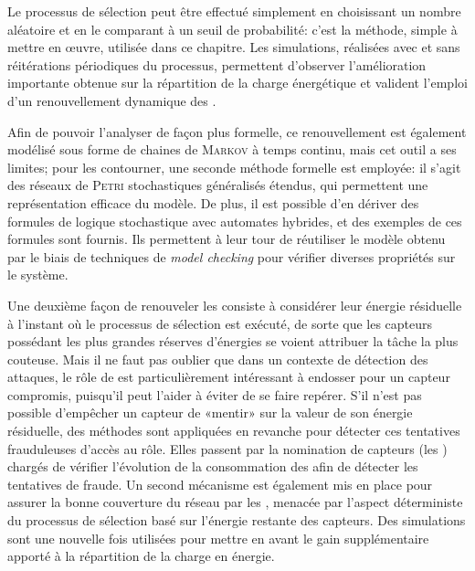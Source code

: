 Le processus de sélection peut être effectué simplement en choisissant un nombre aléatoire et en le comparant à un seuil de probabilité: c'est la méthode, simple à mettre en œuvre, utilisée dans ce chapitre.
Les simulations, réalisées avec et sans réitérations périodiques du processus, permettent d'observer l'amélioration importante obtenue sur la répartition de la charge énergétique et valident l'emploi d'un renouvellement dynamique des \cnst.

Afin de pouvoir l'analyser de façon plus formelle, ce renouvellement est également modélisé sous forme de chaines de \textsc{Markov} à temps continu, mais cet outil a ses limites; pour les contourner, une seconde méthode formelle est employée: il s'agit des réseaux de \textsc{Petri} stochastiques généralisés étendus, qui permettent une représentation efficace du modèle.
De plus, il est possible d'en dériver des formules de logique stochastique avec automates hybrides, et des exemples de ces formules sont fournis. Ils permettent à leur tour de réutiliser le modèle obtenu par le biais de techniques de \textit{model checking} pour vérifier diverses propriétés sur le système.

Une deuxième façon de renouveler les \cnst consiste à considérer leur énergie résiduelle à l'instant où le processus de sélection est exécuté, de sorte que les capteurs possédant les plus grandes réserves d'énergies se voient attribuer la tâche la plus couteuse.
Mais il ne faut pas oublier que dans un contexte de détection des attaques, le rôle de \cnt est particulièrement intéressant à endosser pour un capteur compromis, puisqu'il peut l'aider à éviter de se faire repérer.
S'il n'est pas possible d'empêcher un capteur de «mentir» sur la valeur de son énergie résiduelle, des méthodes sont appliquées en revanche pour détecter ces tentatives frauduleuses d'accès au rôle.
Elles passent par la nomination de capteurs (les \vnst) chargés de vérifier l'évolution de la consommation des \cnst afin de détecter les tentatives de fraude.
Un second mécanisme est également mis en place pour assurer la bonne couverture du réseau par les \cnst, menacée par l'aspect déterministe du processus de sélection basé sur l'énergie restante des capteurs.
Des simulations sont une nouvelle fois utilisées pour mettre en avant le gain supplémentaire apporté à la répartition de la charge en énergie.

